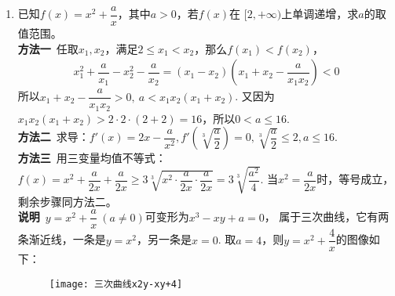 \begin{enumerate}[label={【\textbf{例\thechapter.\arabic*}】},
 leftmargin=\inteval{\myenumleftmargin}pt,
 itemsep=\inteval{\myenumitempsep}pt,
 itemindent=\inteval{\myenumitemindent}pt]
\begin{figure}[h]
    \centering
    \texttt{[image: 三次曲线-分子零点在右侧]}
\end{figure} \\
若要手工粗略绘制此函数的图像，遵循以下步骤：先绘制两条垂直渐近线，再根据
三次函数$y=(x+2)(x-2)(3-x) $的正负，确定$ y=\dfrac{2(3-x)}{x^2-4} $在区间
$ (-\infty,-2),(-2,2),(2,3),\\ (3,+\infty) $上的正负。当$ |x|\to +\infty $时，
$ \dfrac{2(3-x)}{x^2-4}\approx -\dfrac{2}{x} $，所以要让曲线逐渐靠近$ x $轴
(体现水平渐近线的作用)。

对于$ y=\dfrac{2(3\pm x)}{x^2-4} $，
它们的分子的零点在分母两个零点所形成的区间的外部，
存在两个极值点。而对于$ y=\dfrac{x-1}{x^2-4} $，它的分子的零点在分母两个零点之间，
不存在极值点，在两条垂直渐近线所划分的三个区间中都是单调递减的，当$ |x|\to +\infty $
时，$ \dfrac{x-1}{x^2-4}\approx \dfrac{1}{x} $，其图像如下：
\begin{figure}[h]
    \centering
    \texttt{[image: 三次曲线-分子零点在中间]}
\end{figure} \\
再展示几种三次曲线的图像如下：
\begin{figure}[h]
    \centering
    \texttt{[image: 三次曲线-附加三幅图]}
\end{figure} \\

\item 已知$ f(x)=x^2+\dfrac{a}{x} $，其中$ a>0 $，若$ f(x) $在
$ [2,+\infty) $上单调递增，求$ a $的取值范围。 \\
\textbf{方法一}\ 任取$ x_1,x_2 $，满足$ 2\leq x_1<x_2 $，那么$ f(x_1)<f(x_2) $，
\begin{align*}
    x_1^2+\dfrac{a}{x_1}-x_2^2-\dfrac{a}{x_2} 
    =(x_1-x_2)\left(x_1+x_2-\dfrac{a}{x_1x_2} \right) <0 
\end{align*} 
所以$ x_1+x_2-\dfrac{a}{x_1x_2}>0,\ a<x_1x_2(x_1+x_2) $. 又因为
$ x_1x_2(x_1+x_2)>2\cdot 2 \cdot(2+2)=16 $，所以$ 0<a\leq 16 $. \\
\textbf{方法二}\ 求导：$ f'(x)=2x-\dfrac{a}{x^2},f'\left(\sqrt[3]{
    \dfrac{a}{2}} \right)=0,\sqrt[3]{\dfrac{a}{2}}\leq 2,a\leq 16 $. \\
\textbf{方法三}\ 用三变量均值不等式：$ f(x)=x^2+\dfrac{a}{2x}+\dfrac{a}{2x} 
\geq 3\sqrt[3]{x^2\cdot\dfrac{a}{2x}\cdot\dfrac{a}{2x}}=
3\sqrt[3]{\dfrac{a^2}{4}} $. 当$ x^2=\dfrac{a}{2x} $时，等号成立，
剩余步骤同方法二。 \\
\textbf{说明}\ $ y=x^2+\dfrac{a}{x}\ (a\neq 0) $可变形为$ x^3-xy+a=0 $，
属于三次曲线，它有两条渐近线，一条是$ y=x^2 $，另一条是$ x=0 $. 
取$ a=4 $，则$ y=x^2+\dfrac{4}{x} $的图像如下：\\
\begin{figure}[h]
    \centering
    \texttt{[image: 三次曲线x2y-xy+4]}
\end{figure} 


\end{enumerate}
